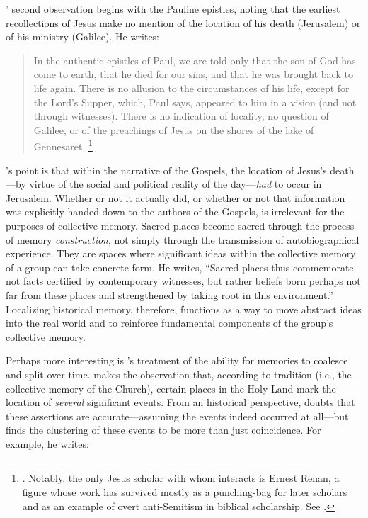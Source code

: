 \halbwachs' second observation begins with the Pauline epistles, noting that the earliest recollections of Jesus make no mention of the location of his death (Jerusalem) or of his ministry (Galilee). He writes:  

\begin{quote}
    In the authentic epistles of Paul, we are told only that the son of God has come to earth, that he died for our sins, and that he was brought back to life again. There is no allusion to the circumstances of his life, except for the Lord's Supper, which, Paul says, appeared to him in a vision (and not through witnesses). There is no indication of locality, no question of Galilee, or of the preachings of Jesus on the shores of the lake of Gennesaret.%
        \footnote{%
            \Cite[209]{halbwachs1992}.
            Notably, the only Jesus scholar with whom \halbwachs interacts is Ernest Renan, a figure whose work has survived mostly as a punching-bag for later scholars and as an example of overt anti-Semitism in biblical scholarship. See 
            \cite[39]{heschel2008}.}
\end{quote}  
\noindent
\halbwachs's point is that within the narrative of the Gospels, the location of Jesus's death---by virtue of the social and political reality of the day---\emph{had} to occur in Jerusalem.%
    \autocite[211]{halbwachs1992}
Whether or not it actually did, or whether or not that information was explicitly handed down to the authors of the Gospels, is irrelevant for the purposes of collective memory. Sacred places become sacred through the process of memory \emph{construction}, not simply through the transmission of autobiographical experience. They are spaces where significant ideas within the collective memory of a group can take concrete form. He writes, ``Sacred places thus commemorate not facts certified by contemporary witnesses, but rather beliefs born perhaps not far from these places and strengthened by taking root in this environment.''%
    \autocite[199]{halbwachs1992}
Localizing historical memory, therefore, functions as a way to move abstract ideas into the real world and to reinforce fundamental components of the group's collective memory.  

Perhaps more interesting is \halbwachs's treatment of the ability for memories to coalesce and split over time. \halbwachs makes the observation that, according to tradition (i.e., the collective memory of the Church), certain places in the Holy Land mark the location of \emph{several} significant events. From an historical perspective, \halbwachs doubts that these assertions are accurate---assuming the events indeed occurred at all---but finds the clustering of these events to be more than just coincidence. For example, he writes:  

